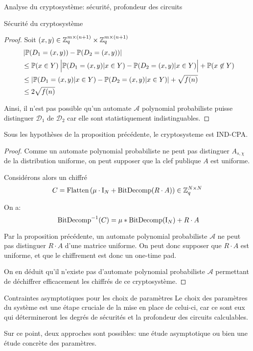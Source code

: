 \begin{section}{Analyse du cryptosystème: sécurité, profondeur des circuits}
\begin{subsection}{Sécurité du cryptosystème}
\begin{proof}
	
	Soit $(x,y)\in \mathbb{Z}_q^{m \times (n+1)} \times \mathbb{Z}_q^{m \times (n+1)}$
	\begin{align*}
	&\left|\PP(D_1 = (x,y)) - \PP(D_2 = (x,y))\right| \\ &\leq \PP(x\in Y)\:
	\Big|\PP(D_1 
	= (x,y)| x\in Y) - \PP(D_2 = (x,y)|x\in Y)\Big| + \PP(x \not\in Y)  \\
	&\leq |\PP(D_1 = (x,y) | x \in Y) - \PP(D_2 = (x,y)|x \in Y)| + \sqrt{f(n)} \\
	&\leq 2\sqrt{f(n)} 
	\end{align*}
	
	Ainsi, il n'est pas possible qu'un automate $\mathcal{A}$
	polynomial probabiliste puisse distinguer 
	$\mathcal{D}_1$ de $\mathcal{D}_2$ car elle sont statistiquement 
	indistinguables.
	\end{proof}
	\begin{thm}
	Sous les hypothèses de la proposition précédente, le
	cryptosysteme est IND-CPA.
	\end{thm}
	\begin{proof}
	Comme un automate polynomial probabiliste ne peut pas distinguer
	$A_{s, \chi}$ de la distribution uniforme, on peut supposer que la
	clef publique $A$ est uniforme.

	Considérons alors un chiffré 
	\[C = \text{Flatten}\left(\mu \cdot \text{I}_N + \text{BitDecomp}(R\cdot A)\right) \in
	\mathbb{Z}_q^{N\times N}\]

	On a:
	\[ \bitdecomp^{-1}(C) = \mu * \bitdecomp(\id_N) + R\cdot A\]

	Par la proposition précédente, un automate polynomial probabiliste $\mathcal{A}$
	ne peut pas distinguer $R\cdot A$ d'une matrice uniforme. On peut donc
	supposer que $R\cdot A$ est uniforme, et que le chiffrement est donc
	un one-time pad.

	On en déduit qu'il n'existe pas d'automate polynomial probabiliste
	$\mathcal{A}$ permettant de déchiffrer efficacement les chiffrés de ce cryptosystème.
	\end{proof}
	
	\end{subsection}

	\begin{subsection}{Contraintes asymptotiques pour les choix de paramètres} 
		Le choix des paramètres du système est une étape cruciale de la mise en place de celui-ci,
	car ce sont eux qui détermineront les degrés de sécurités et la profondeur des circuits calculables.
	
	Sur ce point, deux approches sont possibles: une étude asymptotique ou
	bien une étude \og concrète \fg des paramètres.


\end{subsection}
\end{section}
